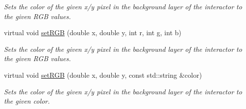 \begin{DoxyCompactItemize}
\begin{DoxyCompactList}\small\item\em Sets the color of the given x/y pixel in the background layer of the interactor to the given R\+GB values. \end{DoxyCompactList}\item 
virtual void \mbox{\hyperlink{classGDrawingSurface_a81202471d4fc9f2015aef0bc073acfab}{set\+R\+GB}} (double x, double y, int r, int g, int b)
\begin{DoxyCompactList}\small\item\em Sets the color of the given x/y pixel in the background layer of the interactor to the given R\+GB values. \end{DoxyCompactList}\item 
virtual void \mbox{\hyperlink{classGDrawingSurface_ae9a228792d4bb4b628350f39eaa3ad12}{set\+R\+GB}} (double x, double y, const std\+::string \&color)
\begin{DoxyCompactList}\small\item\em Sets the color of the given x/y pixel in the background layer of the interactor to the given color. \end{DoxyCompactList}\end{DoxyCompactItemize}
